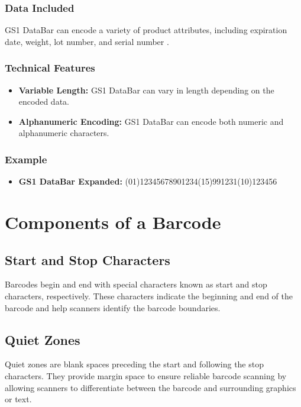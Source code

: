 \subsubsection{Data Included}
GS1 DataBar can encode a variety of product attributes, including expiration date, weight, lot number, and serial number \cite{gs1_databar_info}.

\subsubsection{Technical Features}
\begin{itemize}
	\item \textbf{Variable Length:} GS1 DataBar can vary in length depending on the encoded data.
	\item \textbf{Alphanumeric Encoding:} GS1 DataBar can encode both numeric and alphanumeric characters.
\end{itemize}

\subsubsection{Example}
\begin{itemize}
	\item \textbf{GS1 DataBar Expanded:} (01)12345678901234(15)991231(10)123456
\end{itemize}

\section{Components of a Barcode}

\subsection{Start and Stop Characters}
Barcodes begin and end with special characters known as start and stop characters, respectively. These characters indicate the beginning and end of the barcode and help scanners identify the barcode boundaries.

\subsection{Quiet Zones}
Quiet zones are blank spaces preceding the start and following the stop characters. They provide margin space to ensure reliable barcode scanning by allowing scanners to differentiate between the barcode and surrounding graphics or text.

